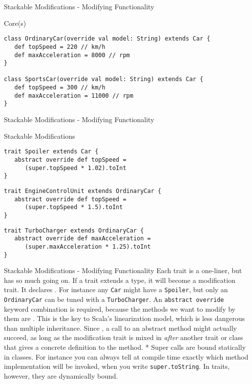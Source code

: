 \begin{frame}[fragile]{Stackable Modifications - Modifying Functionality}
\begin{exampleblock}{Core(s)}
\begin{lstlisting}
class OrdinaryCar(override val model: String) extends Car {
   def topSpeed = 220 // km/h
   def maxAcceleration = 8000 // rpm
}

class SportsCar(override val model: String) extends Car {
   def topSpeed = 300 // km/h
   def maxAcceleration = 11000 // rpm
}
\end{lstlisting}
\end{exampleblock}
\end{frame}

\begin{frame}[fragile]{Stackable Modifications - Modifying Functionality}
\begin{exampleblock}{Stackable Modifications}
\begin{lstlisting}
trait Spoiler extends Car {
   abstract override def topSpeed =
      (super.topSpeed * 1.02).toInt
}
\end{lstlisting}
\pause
\begin{lstlisting}
trait EngineControlUnit extends OrdinaryCar {
   abstract override def topSpeed = 
      (super.topSpeed * 1.5).toInt
}
\end{lstlisting}
\pause
\begin{lstlisting}
trait TurboCharger extends OrdinaryCar {
   abstract override def maxAcceleration =
      (super.maxAcceleration * 1.25).toInt
}
\end{lstlisting}
\end{exampleblock}
\end{frame}

\begin{frame}[fragile]{Stackable Modifications - Modifying Functionality}
Each trait is a one-liner, but has so much going on. If a trait extends a type,
it will become a modification trait. It declares . For instance any \lstinline!Car! might have a
\lstinline!Spoiler!, but only an \lstinline!OrdinaryCar! can be tuned with a
\lstinline!TurboCharger!. An \lstinline!abstract override! keyword combination is
required, because the methods we want to modify by  them
are . This is the key to Scala's linearization model, which
is less dangerous than multiple inheritance. Since , a call to an abstract method might actually succeed, as
long as the modification trait is mixed in \emph{after} another trait or class that gives a concrete
definition to the method.
\newline
\newline
* Super calls are bound statically in classes. For instance you can always tell
at compile time exactly which method implementation will be invoked, when you write
\lstinline!super.toString!. In traits, however, they are dynamically bound.
\end{frame}

